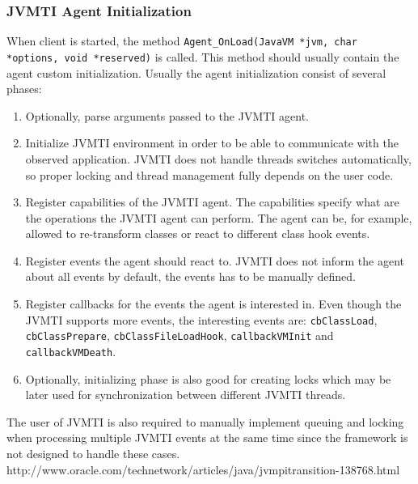 \subsubsection{JVMTI Agent Initialization}
\label{subsec:jvmti_init}
When client is started, the method \newline \texttt{Agent\_OnLoad(JavaVM *jvm, char *options, void *reserved)} is called. This method should usually contain the agent custom initialization. Usually the agent initialization consist of several phases:
\begin{enumerate}
	\item Optionally, parse arguments passed to the JVMTI agent.
	\item Initialize JVMTI environment in order to be able to communicate with the observed application. JVMTI does not handle threads switches automatically, so proper locking and thread management fully depends on the user code.
	\item Register capabilities of the JVMTI agent. The capabilities specify what are the operations the JVMTI agent can perform. The agent can be, for example, allowed to re-transform classes or react to different class hook events.
	\item Register events the agent should react to. JVMTI does not inform the agent about all events by default, the events has to be manually defined.
	\item Register callbacks for the events the agent is interested in. Even though the JVMTI supports more events, the interesting events are: \texttt{cbClassLoad}, \texttt{cbClassPrepare}, \texttt{cbClassFileLoadHook}, \texttt{callbackVMInit} and \texttt{callbackVMDeath}.
	\item Optionally, initializing phase is also good for creating locks which may be later used for synchronization between different JVMTI threads.
\end{enumerate}

The user of JVMTI is also required to manually implement queuing and locking when processing multiple JVMTI events at the same time since the framework is not designed to handle these cases. http://www.oracle.com/technetwork/articles/java/jvmpitransition-138768.html

